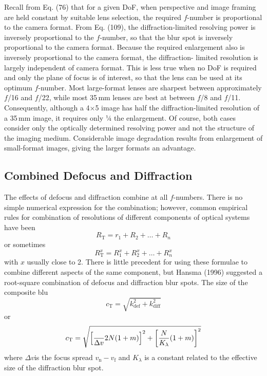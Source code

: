 \documentclass[11pt, oneside]{scrartcl}   	%
\newcommand{\Dv}{\ensuremath{\Delta v}}
\begin{document}
Recall from Eq. (76) that for a given DoF, when perspective and
image framing are held constant by suitable lens selection, the
required $f$-number is proportional to the camera format. From
Eq. (109), the diffraction-limited resolving power is inversely
proportional to the $f$-number, so that the blur spot is inversely proportional to the camera format. Because the required enlargement also is inversely proportional to the camera format, the diffraction- limited resolution is largely independent of camera format. This is less true when no DoF is required and only the plane of focus is of interest, so that the lens can be used at its optimum $f$-number. Most large-format lenses are sharpest between approximately $f$/16 and $f$/22, while most 35\,mm lenses are best at between $f$/8 and $f$/11. Consequently, although a 4$\times$5 image has half the diffraction-limited resolution of a 35\,mm image, it requires only 1⁄4 the enlargement. Of course, both cases consider only the optically determined resolving power and not the structure of the imaging medium. Considerable image degradation results from enlargement of small-format images, giving the larger formats an advantage.

\subsection{Combined Defocus and Diffraction}
\label{sec:comb-defoc-diffr}


The effects of defocus and diffraction combine at all
$f$-numbers. There is no simple numerical expression for the
combination; however, common empirical rules for combination of
resolutions of different components of optical systems have been
\begin{equation}
  \label{eq:110}
  R_\mathrm{T}=r_1 + R_2 + \ldots + R_n
\end{equation}
or sometimes
\begin{equation}
  \label{eq:111}
  R^x_\mathrm{T}=R^x_1 + R^x_2 + \ldots + R^x_n
\end{equation}
with $x$ usually close to 2. There is little precedent for using these formulae to combine different aspects of the same component, but Hansma (1996) suggested a root-square combination of defocus and diffraction blur spots. The size of the composite blu
\begin{equation}
  \label{eq:112}
  c_\mathrm{T}=\sqrt{k^2_\mathrm{def}+k^2_\mathrm{diff}}
\end{equation}
or
\begin{equation}
  \label{eq:113}
  c_\mathrm{T} = \sqrt{ \left[ \frac\Dv{2N(1+m)}\right]^2 + \left[\frac N{K_\lambda}(1+m)\right]^2}
\end{equation}
where \Dv is the focus spread $v_\mathrm{n} - v_\mathrm{f}$ and $K_\lambda$ is a constant related to the effective size of the diffraction blur spot.
\end{document}
